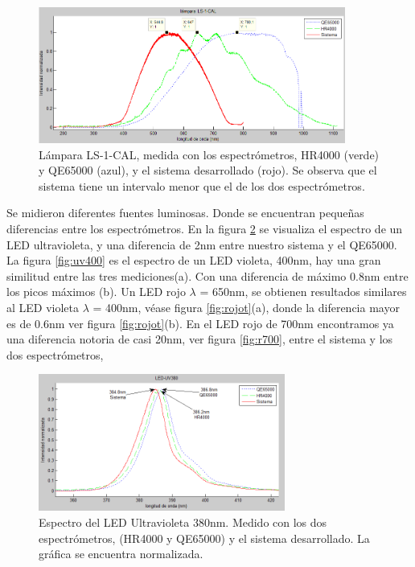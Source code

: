 \begin{figure}[h]
	\centering
	\includegraphics[width=0.9\linewidth,height=4.5cm]{Imagenes/4/ls_t}
	\caption[Espectro de la lámpara LS-1-CAL]{Lámpara LS-1-CAL, medida con los espectrómetros, HR4000 (verde) y QE65000 (azul), y el sistema desarrollado (rojo). Se observa que el sistema tiene un intervalo menor que el de los dos espectrómetros.}
	\label{fig:lst}
\end{figure}

Se midieron diferentes fuentes luminosas. Donde se encuentran pequeñas diferencias entre los espectrómetros. En la figura \ref{fig:uv380t} se visualiza el espectro de un LED ultravioleta, y una diferencia de 2nm entre nuestro sistema y el QE65000. La figura \ref{fig:uv400} es el espectro de un LED violeta, 400nm, hay una gran similitud entre las tres mediciones(a). Con una diferencia de máximo 0.8nm entre los picos máximos (b). Un LED rojo $\lambda$ = 650nm, se obtienen resultados similares al LED violeta $\lambda$ = 400nm, véase figura \ref{fig:rojot}(a), donde la diferencia mayor es de 0.6nm ver figura \ref{fig:rojot}(b). En el LED rojo de 700nm encontramos ya una diferencia notoria de casi 20nm, ver figura \ref{fig:r700}, entre el sistema y los dos espectrómetros, 
\begin{figure}[h]
	\centering
	\includegraphics[width=0.9\linewidth,height=4.5cm]{Imagenes/4/uv380t}
	\caption[Espectro del LED Ultravioleta 380nm]{Espectro del LED Ultravioleta 380nm. Medido con los dos espectrómetros, (HR4000 y QE65000) y el sistema desarrollado. La gráfica se encuentra normalizada.}
	\label{fig:uv380t}
\end{figure}

